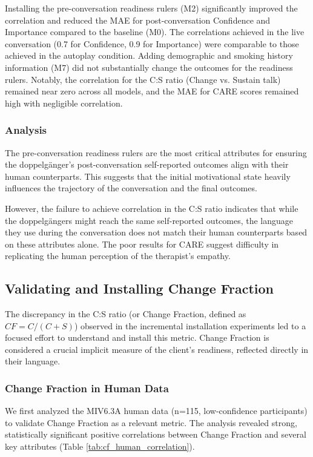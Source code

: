 Installing the pre-conversation readiness rulers (M2) significantly improved the correlation and reduced the MAE for post-conversation Confidence and Importance compared to the baseline (M0). The correlations achieved in the live conversation (0.7 for Confidence, 0.9 for Importance) were comparable to those achieved in the autoplay condition. Adding demographic and smoking history information (M7) did not substantially change the outcomes for the readiness rulers. Notably, the correlation for the C:S ratio (Change vs. Sustain talk) remained near zero across all models, and the MAE for CARE scores remained high with negligible correlation.

\subsubsection{Analysis}

The pre-conversation readiness rulers are the most critical attributes for ensuring the doppelgänger's post-conversation self-reported outcomes align with their human counterparts. This suggests that the initial motivational state heavily influences the trajectory of the conversation and the final outcomes.

However, the failure to achieve correlation in the C:S ratio indicates that while the doppelgängers might reach the same self-reported outcomes, the language they use during the conversation does not match their human counterparts based on these attributes alone. The poor results for CARE suggest difficulty in replicating the human perception of the therapist's empathy.

\subsection{Validating and Installing Change Fraction}

The discrepancy in the C:S ratio (or Change Fraction, defined as $CF = C / (C + S)$) observed in the incremental installation experiments led to a focused effort to understand and install this metric. Change Fraction is considered a crucial implicit measure of the client's readiness, reflected directly in their language.

\subsubsection{Change Fraction in Human Data}

We first analyzed the MIV6.3A human data (n=115, low-confidence participants) to validate Change Fraction as a relevant metric. The analysis revealed strong, statistically significant positive correlations between Change Fraction and several key attributes (Table \ref{tab:cf_human_correlation}).

